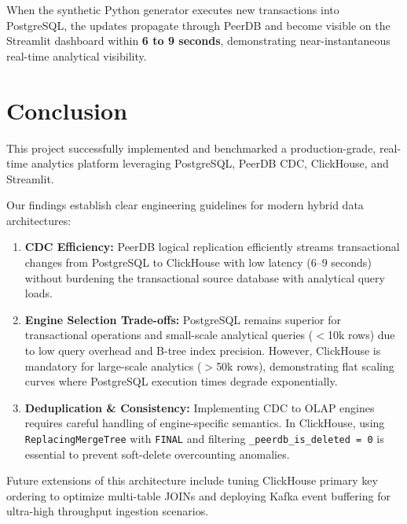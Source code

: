 \documentclass[peerreviewca]{IEEEtran}
\begin{document}
When the synthetic Python generator executes new transactions into PostgreSQL, the updates propagate through PeerDB and become visible on the Streamlit dashboard within \textbf{6 to 9 seconds}, demonstrating near-instantaneous real-time analytical visibility.

\section{Conclusion}
\label{sec:conclusion}

This project successfully implemented and benchmarked a production-grade, real-time analytics platform leveraging PostgreSQL, PeerDB CDC, ClickHouse, and Streamlit.

Our findings establish clear engineering guidelines for modern hybrid data architectures:
\begin{enumerate}
    \item \textbf{CDC Efficiency:} PeerDB logical replication efficiently streams transactional changes from PostgreSQL to ClickHouse with low latency (6--9 seconds) without burdening the transactional source database with analytical query loads.
    \item \textbf{Engine Selection Trade-offs:} PostgreSQL remains superior for transactional operations and small-scale analytical queries ($<$10k rows) due to low query overhead and B-tree index precision. However, ClickHouse is mandatory for large-scale analytics ($>$50k rows), demonstrating flat scaling curves where PostgreSQL execution times degrade exponentially.
    \item \textbf{Deduplication \& Consistency:} Implementing CDC to OLAP engines requires careful handling of engine-specific semantics. In ClickHouse, using \texttt{ReplacingMergeTree} with \texttt{FINAL} and filtering \texttt{\_peerdb\_is\_deleted = 0} is essential to prevent soft-delete overcounting anomalies.
\end{enumerate}

Future extensions of this architecture include tuning ClickHouse primary key ordering to optimize multi-table JOINs and deploying Kafka event buffering for ultra-high throughput ingestion scenarios.
\end{document}
